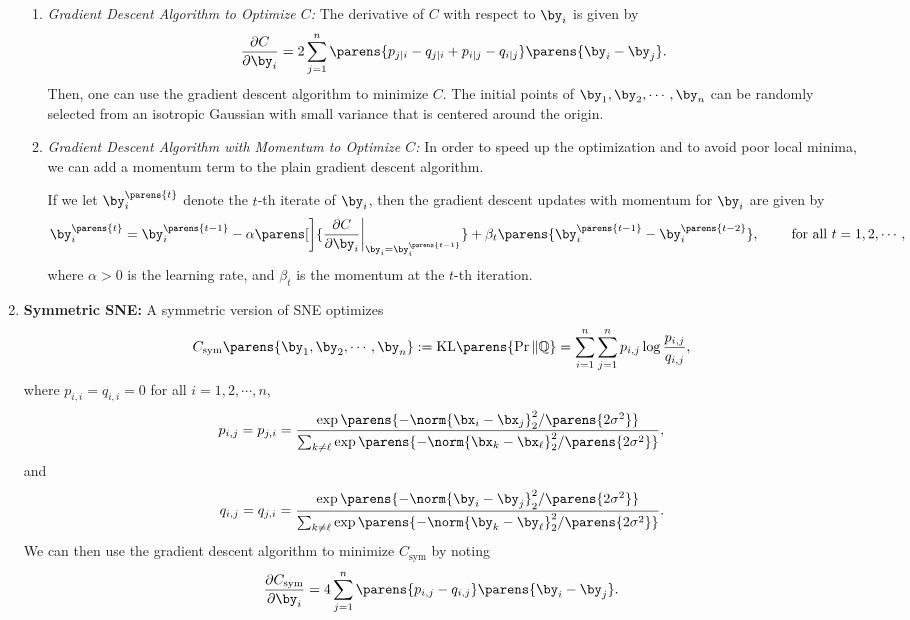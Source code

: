 \documentclass[12pt]{article}
\begin{document}
\begin{enumerate}[label=\textbf{\arabic*.}]
\begin{enumerate}
		\item \textit{Gradient Descent Algorithm to Optimize $C$:} The derivative of $C$ with respect to $\by_i$ is given by 
		\begin{align}\label{eq-sne-gd}
			\frac{\partial C}{\partial \by_i} = 2 \sum_{j=1}^n \parens{p_{j \vert i} - q_{j \vert i} + p_{i \vert j} - q_{i \vert j}} \parens{\by_i - \by_j}. 
		\end{align}
		Then, one can use the gradient descent algorithm to minimize $C$. The initial points of $\by_1, \by_2, \cdots, \by_n$ can be randomly selected from an isotropic Gaussian with small variance that is centered around the origin. 
		
		\item \textit{Gradient Descent Algorithm with Momentum to Optimize $C$:} In order to speed up the optimization and to avoid poor local minima, we can add a momentum term to the plain gradient descent algorithm. 
		
		If we let $\by_i^{\parens{t}}$ denote the $t$-th iterate of $\by_i$, then the gradient descent updates with momentum for $\by_i$ are given by 
		\begin{align*}
			\by_i^{\parens{t}} = \by_i^{\parens{t-1}} - \alpha \parens[\bigg]{\frac{\partial C}{\partial \by_i}\bigg\vert_{\by_i=\by_i^{\parens{t-1}}}} + \beta_t \parens{\by_i^{\parens{t-1}} - \by_i^{\parens{t-2}}}, \qquad \text{ for all } t = 1, 2, \cdots, 
		\end{align*}
		where $\alpha > 0$ is the learning rate, and $\beta_t$ is the momentum at the $t$-th iteration. 
	\end{enumerate}
	
	\item \textbf{Symmetric SNE:} A symmetric version of SNE optimizes 
	\begin{align*}
		C_{\mathrm{sym}} \parens{\by_1, \by_2, \cdots, \by_n} := \mathrm{KL} \parens{\Pr \Vert \mathbb{Q}} = \sum_{i=1}^n \sum_{j=1}^n p_{i,j} \log \frac{p_{i,j}}{q_{i,j}}, 
	\end{align*}
	where $p_{i,i} = q_{i,i} = 0$ for all $i = 1, 2, \cdots, n$, 
	\begin{align*}
		p_{i,j} = p_{j,i} = \frac{\exp \parens{-\norm{\bx_i - \bx_j}_2^2 / \parens{2\sigma^2}}}{\sum_{k \neq \ell} \exp \parens{-\norm{\bx_k - \bx_{\ell}}_2^2 / \parens{2\sigma^2}}}, 
	\end{align*}
	and 
	\begin{align*}
		q_{i,j} = q_{j,i} = \frac{\exp \parens{-\norm{\by_i - \by_j}_2^2 / \parens{2\sigma^2}}}{\sum_{k \neq \ell} \exp \parens{-\norm{\by_k - \by_{\ell}}_2^2 / \parens{2\sigma^2}}}. 
	\end{align*}
	We can then use the gradient descent algorithm to minimize $C_{\mathrm{sym}}$ by noting 
	\begin{align*}
		\frac{\partial C_{\mathrm{sym}}}{\partial \by_i} = 4 \sum_{j=1}^n \parens{p_{i,j} - q_{i,j}} \parens{\by_i - \by_j}. 
	\end{align*}

\end{enumerate}
\end{document}
